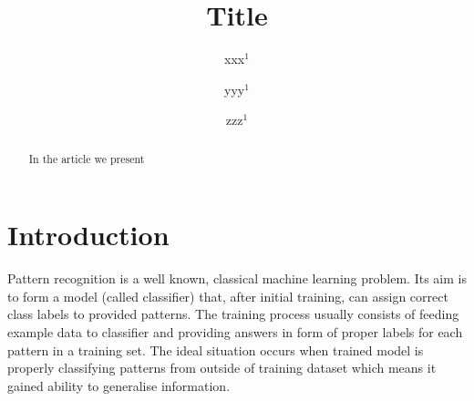 \documentclass{llncs}
\begin{document}
\title{Title}
\author{xxx$^{1}$
\and yyy$^1$
\and zzz$^{1}$
}


\maketitle

\pagestyle{empty}  %

\begin{abstract}
In the article we present
\end{abstract}



\section{Introduction}
  \label{sec:Introduction}





Pattern recognition is a well known, classical machine learning problem. Its aim is to form a model (called classifier) that, after initial training, can assign correct class labels to provided patterns. The training process usually consists of feeding example data to classifier and providing answers in form of proper labels for each pattern in a training set. The ideal situation occurs when trained model is properly classifying patterns from outside of training dataset which means it gained ability to generalise information. \\
\end{document}
